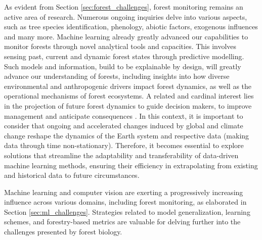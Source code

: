 \documentclass{CUP-JNL-DTM}%
\theoremstyle{definition}
\numberwithin{equation}{section}
\begin{document}
As evident from Section \ref{sec:forest_challenges}, forest monitoring remains an active area of research. Numerous ongoing inquiries delve into various aspects, such as tree species identification, phenology, abiotic factors, exogenous influences and many more.
Machine learning already greatly advanced our capabilities to monitor forests through novel analytical tools and capacities. 
This involves sensing past, current and dynamic forest states through predictive modelling. 
Such models and information, build to be explainable by design, will greatly advance our understanding of forests, including insights into how diverse environmental and anthropogenic drivers impact forest dynamics, as well as the operational mechanisms of forest ecosystems.
%
A related and cardinal interest lies in the projection of future forest dynamics to guide decision makers, to improve management and anticipate consequences \cite{requena-mesa_predicting_2018}. 
In this context, it is important to consider that ongoing and accelerated changes induced by global and climate change reshape the dynamics of the Earth system and respective data (making data through time non-stationary). %
Therefore, it becomes essential to explore solutions that streamline the adaptability and transferability of data-driven machine learning methods, ensuring their efficiency in extrapolating from existing and historical data to future circumstances.


%
%
Machine learning and computer vision are exerting a progressively increasing influence across various domains, including forest monitoring, as elaborated in Section \ref{sec:ml_challenges}. Strategies related to model generalization, learning schemes, and forestry-based metrics are valuable for delving further into the challenges presented by forest biology.
\end{document}
